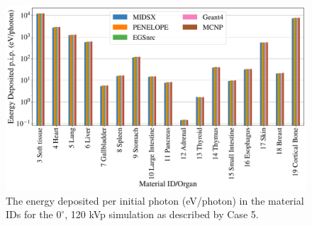
\begin{figure}[htbp]
    \centering
	\includegraphics[width=1.0\textwidth]{../figures/CT_120_0.pdf}
	\caption{The energy deposited per initial photon (eV/photon) in the material IDs for the $0^\circ$, 120 kVp simulation as described by Case 5.}
	\label{fig:CTGraph}
\end{figure}

\FloatBarrier
